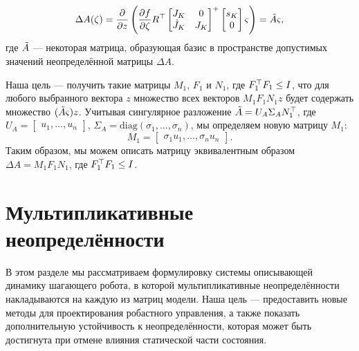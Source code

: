 \begin{equation}
	\Delta {A}(\zeta) = 
	\frac{\partial}{\partial z} 
	\left (
	\frac{\partial f}{\partial \zeta} {R}^\top 
	\begin{bmatrix}
		{J}_K & 0 \\ \dot{{J}}_K & {J}_K
	\end{bmatrix}^+ 
	\begin{bmatrix}
		s_K \\ 0
	\end{bmatrix} \varsigma 
	\right )
	= \Tilde{A} \varsigma,
\end{equation}
%
где $\Tilde{A}$ --- некоторая матрица, образующая базис в пространстве допустимых значений неопределённой матрицы $\Delta {A}$.

Наша цель --- получить такие матрицы ${M}_1$, ${F}_1$ и ${N}_1$, где ${F}_1^\top {F}_1 \leq {I}$, что для любого выбранного вектора $z$ множество всех векторов ${M}_1 {F}_1 {N}_1 z$ будет содержать множество $(\Tilde{A} \varsigma) z$. Учитывая сингулярное разложение $\Tilde{A} = {U}_A {\Sigma}_A {N}_1^\top$, где 
${U}_A = \begin{bmatrix}
	{u}_1, ..., {u}_n
\end{bmatrix}$, 
${\Sigma}_A = \text{diag}(\sigma_1, ..., \sigma_n)$, мы определяем новую матрицу ${M}_1$:
%
\begin{equation}
	{M}_1 = 
	\begin{bmatrix}
		\sigma_1{u}_1, ..., \sigma_n{u}_n
	\end{bmatrix}.
\end{equation}
Таким образом, мы можем описать матрицу эквивалентным образом $\Delta {A} = {M}_1 {F}_1 {N}_1$, где ${F}_1^\top{F}_1\leq {I}$.

\section{Мультипликативные неопределённости}\label{sec:ch3/sect2}

В этом разделе мы рассматриваем формулировку системы описывающей динамику шагающего робота, в которой мультипликативные неопределённости накладываются на каждую из матриц модели. Наша цель --- предоставить новые методы для проектирования робастного управления, а также показать дополнительную устойчивость к неопределённости, которая может быть достигнута при отмене влияния статической части состояния.

